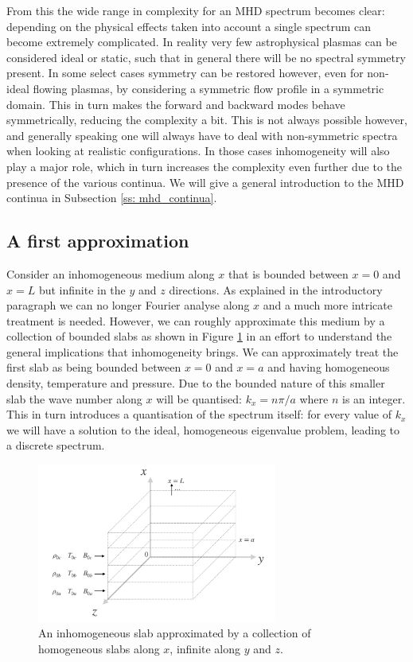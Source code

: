 From this the wide range in complexity for an MHD spectrum becomes clear: depending on the physical effects taken into account a single spectrum can become extremely complicated. In reality very few astrophysical plasmas can be considered ideal or static, such that in general there will be no spectral symmetry present. In some select cases symmetry can be restored however, even for non-ideal flowing plasmas, by considering a symmetric flow profile in a symmetric domain. This in turn makes the forward and backward modes behave symmetrically, reducing the complexity a bit. This is not always possible however, and generally speaking one will always have to deal with non-symmetric spectra when looking at realistic configurations. In those cases inhomogeneity will also play a major role, which in turn increases the complexity even further due to the presence of the various continua. We will give a general introduction to the MHD continua in Subsection \ref{ss: mhd_continua}.


\subsection{A first approximation}
Consider an inhomogeneous medium along $x$ that is bounded between $x = 0$ and $x = L$ but infinite in the $y$ and $z$ directions. As explained in the introductory paragraph we can no longer Fourier analyse along $x$ and a much more intricate treatment is needed. However, we can roughly approximate this medium by a collection of bounded slabs as shown in Figure \ref{fig: bounded_slab} in an effort to understand the general implications that inhomogeneity brings. We can approximately treat the first slab as being bounded between $x = 0$ and $x = a$ and having homogeneous density, temperature and pressure. Due to the bounded nature of this smaller slab the wave number along $x$ will be quantised: $k_x = n\pi / a$ where $n$ is an integer. This in turn introduces a quantisation of the spectrum itself: for every value of $k_x$ we will have a solution to the ideal, homogeneous eigenvalue problem, leading to a discrete spectrum.

\begin{figure}[b]
  \centering
  \includegraphics[width=0.7\textwidth]{confined_slab.png}
  \caption{
    An inhomogeneous slab approximated by a collection of homogeneous slabs along $x$, infinite along $y$ and $z$.
  }
  \label{fig: bounded_slab}
\end{figure}

